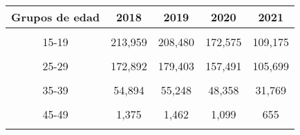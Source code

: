 \begin{tabular}[t]{ccccc}
\toprule
\textbf{Grupos de edad} & \textbf{2018} & \textbf{2019} & \textbf{2020} & \textbf{2021}\\
\midrule
\cellcolor[HTML]{B6B3FF}{10-14} & \cellcolor[HTML]{B6B3FF}{7,506} & \cellcolor[HTML]{B6B3FF}{7,659} & \cellcolor[HTML]{B6B3FF}{6,856} & \cellcolor[HTML]{B6B3FF}{4,703}\\
15-19 & 213,959 & 208,480 & 172,575 & 109,175\\
\cellcolor[HTML]{B6B3FF}{20-24} & \cellcolor[HTML]{B6B3FF}{262,659} & \cellcolor[HTML]{B6B3FF}{267,762} & \cellcolor[HTML]{B6B3FF}{230,079} & \cellcolor[HTML]{B6B3FF}{152,072}\\
25-29 & 172,892 & 179,403 & 157,491 & 105,699\\
\cellcolor[HTML]{B6B3FF}{30-34} & \cellcolor[HTML]{B6B3FF}{103,730} & \cellcolor[HTML]{B6B3FF}{106,045} & \cellcolor[HTML]{B6B3FF}{92,247} & \cellcolor[HTML]{B6B3FF}{62,014}\\
35-39 & 54,894 & 55,248 & 48,358 & 31,769\\
\cellcolor[HTML]{B6B3FF}{40-44} & \cellcolor[HTML]{B6B3FF}{15,872} & \cellcolor[HTML]{B6B3FF}{15,848} & \cellcolor[HTML]{B6B3FF}{13,716} & \cellcolor[HTML]{B6B3FF}{9,198}\\
45-49 & 1,375 & 1,462 & 1,099 & 655\\
\cellcolor[HTML]{B6B3FF}{50-54} & \cellcolor[HTML]{B6B3FF}{258} & \cellcolor[HTML]{B6B3FF}{263} & \cellcolor[HTML]{B6B3FF}{198} & \cellcolor[HTML]{B6B3FF}{132}\\
\bottomrule
\end{tabular}
